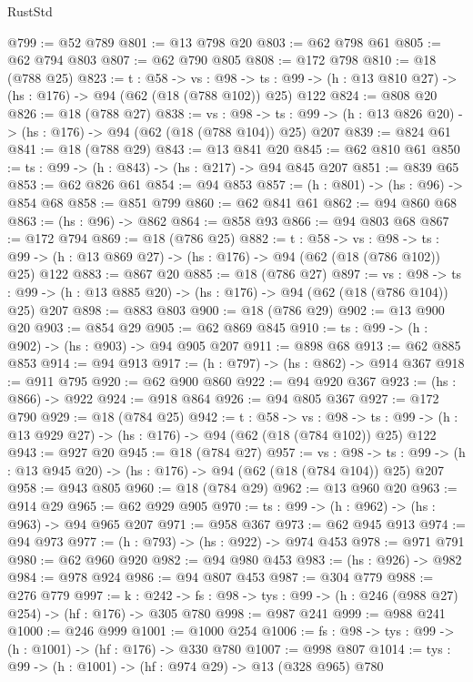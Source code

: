 \begin{lexlean}{RustStd}
\begin{coremodule}
{\begin{coremodule}
{{{{{{{{{@799 := @52 @789
@801 := @13 @798 @20
@803 := @62 @798 @61
@805 := @62 @794 @803
@807 := @62 @790 @805
@808 := @172 @798
@810 := @18 (@788 @25)
@823 := {t : @58} ->
  {vs : @98} ->
  {ts : @99} -> (h : @13 @810 @27) -> (hs : @176) -> @94 (@62 (@18 (@788 @102)) @25) @122
@824 := @808 @20
@826 := @18 (@788 @27)
@838 := {vs : @98} ->
  {ts : @99} -> (h : @13 @826 @20) -> (hs : @176) -> @94 (@62 (@18 (@788 @104)) @25) @207
@839 := @824 @61
@841 := @18 (@788 @29)
@843 := @13 @841 @20
@845 := @62 @810 @61
@850 := {ts : @99} -> (h : @843) -> (hs : @217) -> @94 @845 @207
@851 := @839 @65
@853 := @62 @826 @61
@854 := @94 @853
@857 := (h : @801) -> (hs : @96) -> @854 @68
@858 := @851 @799
@860 := @62 @841 @61
@862 := @94 @860 @68
@863 := (hs : @96) -> @862
@864 := @858 @93
@866 := @94 @803 @68
@867 := @172 @794
@869 := @18 (@786 @25)
@882 := {t : @58} ->
  {vs : @98} ->
  {ts : @99} -> (h : @13 @869 @27) -> (hs : @176) -> @94 (@62 (@18 (@786 @102)) @25) @122
@883 := @867 @20
@885 := @18 (@786 @27)
@897 := {vs : @98} ->
  {ts : @99} -> (h : @13 @885 @20) -> (hs : @176) -> @94 (@62 (@18 (@786 @104)) @25) @207
@898 := @883 @803
@900 := @18 (@786 @29)
@902 := @13 @900 @20
@903 := @854 @29
@905 := @62 @869 @845
@910 := {ts : @99} -> (h : @902) -> (hs : @903) -> @94 @905 @207
@911 := @898 @68
@913 := @62 @885 @853
@914 := @94 @913
@917 := (h : @797) -> (hs : @862) -> @914 @367
@918 := @911 @795
@920 := @62 @900 @860
@922 := @94 @920 @367
@923 := (hs : @866) -> @922
@924 := @918 @864
@926 := @94 @805 @367
@927 := @172 @790
@929 := @18 (@784 @25)
@942 := {t : @58} ->
  {vs : @98} ->
  {ts : @99} -> (h : @13 @929 @27) -> (hs : @176) -> @94 (@62 (@18 (@784 @102)) @25) @122
@943 := @927 @20
@945 := @18 (@784 @27)
@957 := {vs : @98} ->
  {ts : @99} -> (h : @13 @945 @20) -> (hs : @176) -> @94 (@62 (@18 (@784 @104)) @25) @207
@958 := @943 @805
@960 := @18 (@784 @29)
@962 := @13 @960 @20
@963 := @914 @29
@965 := @62 @929 @905
@970 := {ts : @99} -> (h : @962) -> (hs : @963) -> @94 @965 @207
@971 := @958 @367
@973 := @62 @945 @913
@974 := @94 @973
@977 := (h : @793) -> (hs : @922) -> @974 @453
@978 := @971 @791
@980 := @62 @960 @920
@982 := @94 @980 @453
@983 := (hs : @926) -> @982
@984 := @978 @924
@986 := @94 @807 @453
@987 := @304 @779
@988 := @276 @779
@997 := {k : @242} ->
  {fs : @98} -> {tys : @99} -> (h : @246 (@988 @27) @254) -> (hf : @176) -> @305 @780
@998 := @987 @241
@999 := @988 @241
@1000 := @246 @999
@1001 := @1000 @254
@1006 := {fs : @98} -> {tys : @99} -> (h : @1001) -> (hf : @176) -> @330 @780
@1007 := @998 @807
@1014 := {tys : @99} -> (h : @1001) -> (hf : @974 @29) -> @13 (@328 @965) @780
}}}}}}}}}
\end{coremodule}}
\end{coremodule}
\end{lexlean}
